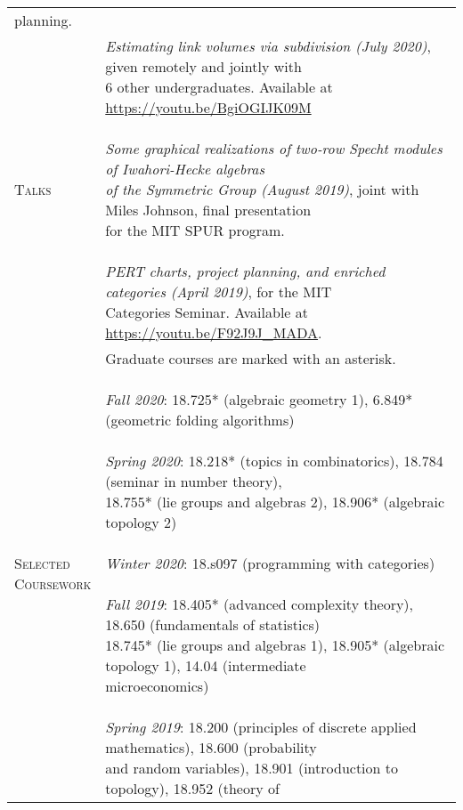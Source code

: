 \documentclass[a4paper,10pt]{article} %
\begin{document}
\begin{tabularx}{\textwidth}{l X}
{    planning.}\\
  \textsc{\small Talks}
  & \Longunderstack{\textit{Estimating link volumes via subdivision (July 2020)}, given remotely and jointly with \\
  6 other undergraduates. Available at \href{https://youtu.be/BgiOGIJK09M}{https://youtu.be/BgiOGIJK09M}\\ \\
  \textit{Some graphical realizations of two-row Specht modules of Iwahori-Hecke algebras}\\
  \textit{of the Symmetric Group (August 2019)}, joint with Miles Johnson, final presentation \\
  for the MIT SPUR program.\\ \\
  \textit{PERT charts, project planning, and enriched categories (April 2019)}, for the MIT\\
  Categories Seminar. Available at \href{https://youtu.be/F92J9J_MADA}{https://youtu.be/F92J9J\_MADA}. 
}\\
  \Longunderstack{\textsc{\small Selected}\\\textsc{\small Coursework}}
  & \Longunderstack{Graduate courses are marked with an asterisk.\\ \\ 
    \textit{Fall 2020}: 18.725* (algebraic geometry 1), 6.849* (geometric folding algorithms)\\ \\
  \textit{Spring 2020}: 18.218* (topics in combinatorics), 18.784 (seminar in number theory), \\
  18.755* (lie groups and algebras 2), 18.906* (algebraic topology 2) \\ \\
  \textit{Winter 2020}: 18.s097 (programming with categories)\\ \\
  \textit{Fall 2019}: 18.405* (advanced complexity theory), 18.650 (fundamentals of statistics)\\
  18.745* (lie groups and algebras 1), 18.905* (algebraic topology 1), 14.04 (intermediate\\
  microeconomics)\\ \\
  \textit{Spring 2019}: 18.200 (principles of discrete applied mathematics), 18.600 (probability\\
  and random variables), 18.901 (introduction to topology), 18.952 (theory of\\
}
\end{tabularx}
\end{document}
